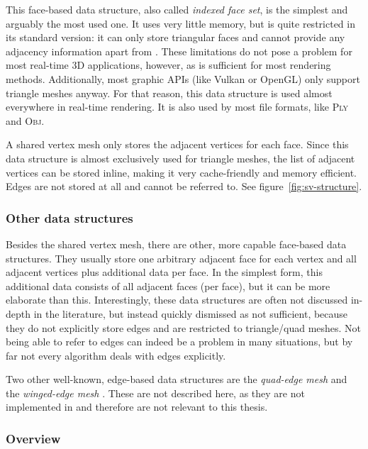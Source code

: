 This face-based data structure, also called \emph{indexed face set}, is the simplest and arguably the most used one.
It uses very little memory, but is quite restricted in its standard version:
it can only store triangular faces and cannot provide any adjacency information apart from .
These limitations do not pose a problem for most real-time 3D applications, however, as  is sufficient for most rendering methods.
Additionally, most graphic APIs (like Vulkan or OpenGL) only support triangle meshes anyway.
For that reason, this data structure is used almost everywhere in real-time rendering.
It is also used by most file formats, like \textsc{Ply} and \textsc{Obj}.

A shared vertex mesh only stores the adjacent vertices for each face.
Since this data structure is almost exclusively used for triangle meshes, the list of adjacent vertices can be stored inline, making it very cache-friendly and memory efficient.
Edges are not stored at all and cannot be referred to. See figure~\ref{fig:sv-structure}.


\subsubsection*{Other data structures}

Besides the shared vertex mesh, there are other, more capable face-based data structures.
They usually store one arbitrary adjacent face for each vertex and all adjacent vertices plus additional data per face.
In the simplest form, this additional data consists of all adjacent faces (per face), but it can be more elaborate than this.
Interestingly, these data structures are often not discussed in-depth in the literature, but instead quickly dismissed as not sufficient, because they do not explicitly store edges and are restricted to triangle/quad meshes.
Not being able to refer to edges can indeed be a problem in many situations, but by far not every algorithm deals with edges explicitly.

Two other well-known, edge-based data structures are the \emph{quad-edge mesh} \cite{guibas1985primitives} and the \emph{winged-edge mesh} \cite{baumgart1972winged}.
These are not described here, as they are not implemented in  and therefore are not relevant to this thesis.

\newpage
\subsubsection*{Overview}

